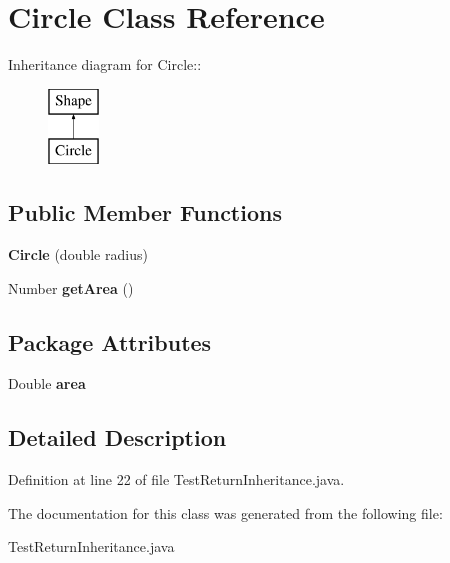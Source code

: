\section{Circle Class Reference}
\label{classCircle}
Inheritance diagram for Circle::\begin{figure}[H]
\begin{center}
\leavevmode
\includegraphics[height=2cm]{classCircle}
\end{center}
\end{figure}
\subsection*{Public Member Functions}
\begin{CompactItemize}
\item 
{\bf Circle} (double radius)\label{classCircle_05c707753451188c26b43508b610ff8e}

\item 
Number {\bf get\-Area} ()\label{classCircle_31746d74f86226e3c35561a3f0cccf9b}

\end{CompactItemize}
\subsection*{Package Attributes}
\begin{CompactItemize}
\item 
Double {\bf area}\label{classCircle_a8d702f9c81180ccaabd7277e156b56c}

\end{CompactItemize}


\subsection{Detailed Description}




Definition at line 22 of file Test\-Return\-Inheritance.java.

The documentation for this class was generated from the following file:\begin{CompactItemize}
\item 
Test\-Return\-Inheritance.java\end{CompactItemize}
